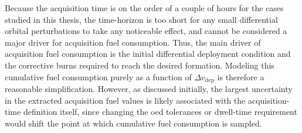 Because the acquisition time is on the order of a couple of hours for the cases studied in this thesis, the time-horizon is too short for any small differential orbital perturbations to take any noticeable effect, and cannot be considered a major driver for acquisition fuel consumption. Thus, the main driver of acquisition fuel consumption is the initial differential deployment condition and the corrective burns required to reach the desired formation. Modeling this cumulative fuel consumption purely as a function of $\Delta v_{\mathrm{dep}}$ is therefore a reasonable simplification. However, as discussed initially, the largest uncertainty in the extracted acquisition fuel values is likely associated with the acquisition-time definition itself, since changing the \gls{oed} tolerances or dwell-time requirement would shift the point at which cumulative fuel consumption is sampled. 

